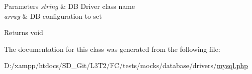 \begin{DoxyParams}{Parameters}
{\em string} & D\+B Driver class name \\
\hline
{\em array} & D\+B configuration to set \\
\hline
\end{DoxyParams}
\begin{DoxyReturn}{Returns}
void 
\end{DoxyReturn}


The documentation for this class was generated from the following file\+:\begin{DoxyCompactItemize}
\item 
D\+:/xampp/htdocs/\+S\+D\+\_\+\+Git/\+L3\+T2/\+F\+C/tests/mocks/database/drivers/\hyperlink{drivers_2mysql_8php}{mysql.\+php}\end{DoxyCompactItemize}
